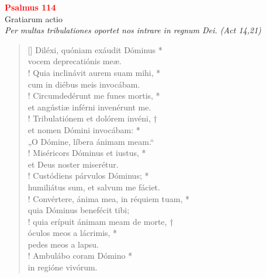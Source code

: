 
\def\greinitialformat#1{%
{\fontsize{39}{39}\selectfont #1}%
}




\vspace{0.3cm}
\begin{center}
 \textcolor{red}{\large \bf Psalmus 114}\\
Gratiarum actio\\
\textit{\small Per multas tribulationes oportet nos intrare in regnum Dei. (Act 14,21)}
\end{center}
\begin{verse}[\versewidth]
Diléxi, quóniam exáudit Dóminus *\\
vocem deprecatiónis meæ.\\!
\vin  Quia inclinávit aurem suam mihi, *\\
\vin  cum in diébus meis invocábam.\\!
Circumdedérunt me funes mortis, *\\
et angústiæ inférni invenérunt me.\\!
\vin  Tribulatiónem et dolórem invéni, †\\
\vin  et nomen Dómini invocábam: *\\
\vin  „O Dómine, líbera ánimam meam.“\\!
Miséricors Dóminus et iustus, *\\
et Deus noster miserétur.\\!
\vin  Custódiens párvulos Dóminus; *\\
\vin  humiliátus sum, et salvum me fáciet.\\!
Convértere, ánima mea, in réquiem tuam, *\\
quia Dóminus benefécit tibi;\\!
\vin  quia erípuit ánimam meam de morte, †\\
\vin  óculos meos a lácrimis, *\\
\vin  pedes meos a lapsu.\\!
Ambulábo coram Dómino *\\
in regióne vivórum.\\
\end{verse}
\vspace{1cm}